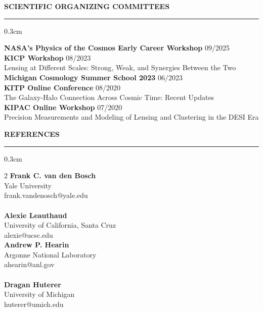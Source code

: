\documentclass[12pt]{article}
\renewenvironment{section}[1]
  {
  \medskip
  {\color{aublue} \MakeUppercase{\bf #1}}
  \smallskip
  \hrule
  \medskip
  \begin{adjustwidth}{0.3cm}{}
  }
  {
  \end{adjustwidth}
  }
\newcommand{\entry}[3]{{\bf #1} \hfill {#2} \\ {#3}}
\begin{document}
\begin{section}{Scientific Organizing Committees}
  \entry{NASA's Physics of the Cosmos Early Career Workshop}{09/2025}{}
  \entry{KICP Workshop}{08/2023}{Lensing at Different Scales: Strong, Weak, and Synergies Between the Two} \\
  \entry{Michigan Cosmology Summer School 2023}{06/2023}{}
  \entry{KITP Online Conference}{08/2020}{The Galaxy-Halo Connection Across Cosmic Time: Recent Updates}\\
  \entry{KIPAC Online Workshop}{07/2020}{Precision Measurements and Modeling of Lensing and Clustering in the DESI Era}
\end{section}

\begin{section}{References}
    \begin{multicols*}{2}
    \entry{Frank C. van den Bosch}{}{Yale University\\frank.vandenosch@yale.edu} \\ \\
    \entry{Alexie Leauthaud}{}{University of California, Santa Cruz\\alexie@ucsc.edu} \columnbreak \\
    \entry{Andrew P. Hearin}{}{Argonne National Laboratory\\ahearin@anl.gov} \\ \\
    \entry{Dragan Huterer}{}{University of Michigan\\huterer@umich.edu}
    \end{multicols*}
\end{section}
\end{document}
